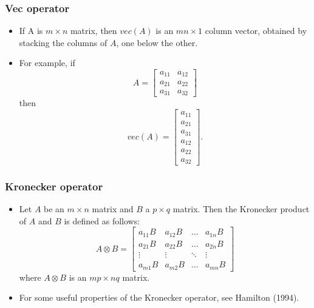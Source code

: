 \documentclass{beamer}
\begin{document}
\begin{frame}
\frametitle{Vec operator}
\small \label{kron}
\begin{itemize}
	\item If A is $ m \times n $ matrix, then $ vec(A) $ is an $ mn \times 1 $ column vector, obtained by stacking the columns of $ A $, one below the other.
	\item For example, if
	\begin{equation*}
	A = \begin{bmatrix}
	a_{11} & a_{12} \\ 
	a_{21} & a_{22} \\ 
	a_{31} & a_{32}
	\end{bmatrix} 
	\end{equation*}
	then
	\begin{equation*}
	vec(A) = \begin{bmatrix}
	a_{11} \\ 
	a_{21} \\ 
	a_{31} \\
	a_{12} \\ 
	a_{22} \\ 
	a_{32}  
	\end{bmatrix}.
	\end{equation*}
\end{itemize}
\end{frame}

\begin{frame}
\frametitle{Kronecker operator}
\begin{itemize}
	\item Let $ A $ be an $ m \times n $ matrix and $ B $ a $ p \times q $ matrix. Then the Kronecker product of $ A $ and $ B $ is defined as follows:
	\begin{equation*}
	A \otimes B = \begin{bmatrix}
	a_{11} B & a_{12} B & \dots & a_{1n} B \\ 
	a_{21} B & a_{22} B & \dots & a_{2n} B \\ 
	\vdots & \vdots & \ddots &  \vdots \\ 
	a_{m1} B & a_{m2} B & \dots & a_{mn} B
	\end{bmatrix} 
	\end{equation*}
	where $ A \otimes B  $ is an $ mp \times nq $ matrix.
	\item For some useful properties of the Kronecker operator, see Hamilton (1994).
 	\hyperlink{kronBack}{}
	
\end{itemize}
\end{frame}
\end{document}
